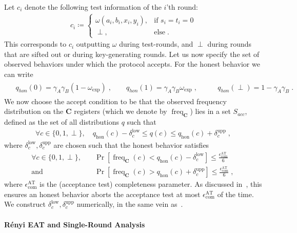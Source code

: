 \documentclass[aps,reprint,showpacs,superscriptaddress]{revtex4-2}
\newcommand{\dupp}{\delta^\mathrm{upp}}
\newcommand{\dlow}{\delta^\mathrm{low}}
\newcommand{\freq}{\operatorname{freq}}
\newcommand{\ecomAT}{\epsilon_{\mathrm{com}}^{\mathrm{AT}}}
\begin{document}
Let $c_{i} $ denote the following test information of the $i$'th round:
\begin{align}
c_{i} \coloneqq \begin{cases}
\omega(a_{i},b_{i},x_{i},y_{i}), & \text{if } s_i=t_i=0 \\
\perp, & \text{else} \; .
\end{cases}
\end{align}
This corresponds to $c_i$ outputting $\omega$ during test-rounds, and $\perp$ during rounds that are sifted out or during key-generating rounds. Let us now specify the set of observed behaviors under which the protocol accepts. For the honest behavior we can write
\begin{align}
\begin{aligned}
&q_{hon}(0) = \gamma_{A}\gamma_{B} \left(1-\omega_{\mathrm{exp}}\right)\; , \qquad q_{hon}(1) = \gamma_{A}\gamma_{B} \omega_{\mathrm{exp}}\; , \qquad
&q_{hon}(\perp) = 1-\gamma_{A}\gamma_{B} \; .
\end{aligned}
\end{align}
We now choose the accept condition to be that the observed frequency distribution on the $\mathbf{C}$ registers (which we denote by $\freq_{\mathbf{C}}$) lies in a set $S_{acc}$, defined as the set of all distributions $q$ such that
\begin{align}
\forall c \in \{0,1,\perp\}, \quad
q_\mathrm{hon}(c) - \dlow_{c} \leq q(c) \leq q_\mathrm{hon}(c) + \dupp_{c}
\; ,
\end{align}
where $\dlow_{c},\dupp_{c}$ are chosen such that the honest behavior satisfies
\begin{align}
\forall c \in \{0,1,\perp\}, &\quad \Pr[\freq_{\mathbf{C}}(c) < q_\mathrm{hon}(c) - \dlow_{c}] \leq \frac{\ecomAT}{6}
\quad\\\text{and}&\quad\Pr[\freq_{\mathbf{C}}(c) > q_\mathrm{hon}(c) + \dupp_{c}] \leq \frac{\ecomAT}{6}  \;
,
\end{align}
where $\ecomAT$ is the (acceptance test) completeness parameter. As discussed in~\cite{hahn2025analytic}, this ensures an honest behavior aborts the acceptance test at most $\ecomAT$ of the time. We construct $\dlow_{c},\dupp_{c}$ numerically, in the same vein as~\cite{hahn2025analytic}.


\newcommand{\eventAT}{\Omega_{EA}}
\paragraph{R\'{e}nyi EAT and Single-Round Analysis}
\end{document}
